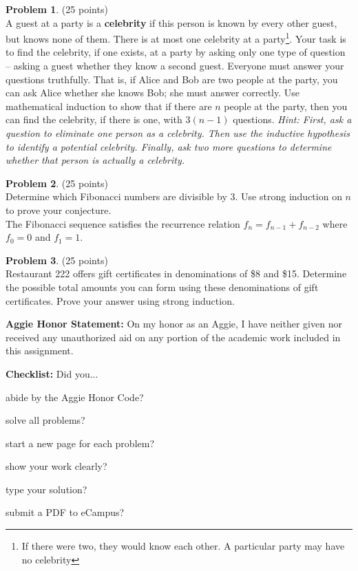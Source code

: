 \documentclass{article}
\theoremstyle{definition}
\newtheorem{problem}{Problem}
\newtheorem*{solution}{Solution}
\newcommand{\honor}{\noindent \textbf{Aggie Honor Statement: }On my honor as an Aggie, I have neither
  given nor received any unauthorized aid on any portion of the academic work included in this assignment.
}
\newcommand{\checklist}{\noindent\textbf{Checklist:}
Did you...
\begin{compactenum}
\item abide by the Aggie Honor Code?
\item solve all problems?
\item start a new page for each problem?
\item show your work clearly?
\item type your solution?
\item submit a PDF to eCampus?
\end{compactenum}
}
\begin{document}
\begin{problem} (25 points)\\
A guest at a party is a \textbf{celebrity} if this person is known by every other guest, but knows none of them. 
There is at most one celebrity at a party\footnote{If there were two, they
would know each other. A particular party may have no celebrity}. 
Your task is to find the celebrity, if one exists, at a party by asking only one type of question --
asking a guest whether they know a second guest.
Everyone must answer your questions truthfully.
That is, if Alice and Bob are two people at the party, you can ask Alice whether she knows Bob; 
she must answer correctly.
Use mathematical induction to show that if there are $n$ people at the party, then you can find the celebrity, if there is one, with $3(n-1)$ questions. 
\textit{Hint: First, ask a question to eliminate one person as a celebrity. 
Then use the inductive hypothesis to identify a potential celebrity.
Finally, ask two more questions to determine whether that person is actually a celebrity.} 
\end{problem}



\begin{problem} (25 points)\\
Determine which Fibonacci numbers are divisible by 3. Use strong induction on $n$ to prove your conjecture.\\
The Fibonacci sequence satisfies the recurrence relation $f_n = f_{n-1} + f_{n-2}$ where $f_0 = 0$ and $f_1 = 1$.
\end{problem}



\begin{problem} (25 points)\\
Restaurant 222 offers gift certificates in denominations of \$8 and \$15.  Determine the possible total amounts you can form using these denominations of gift certificates.  Prove your answer using strong induction.
\end{problem}



\bigskip
\honor

\bigskip
\checklist
\end{document}
